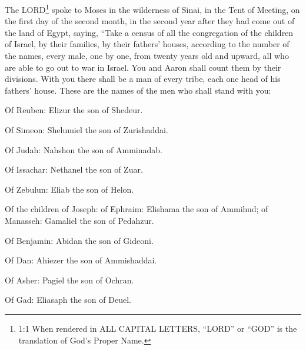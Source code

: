 \newpage
\null
\thispagestyle{empty}
\newpage







\vspace{-1.36in}

\mychapter{}
\myverse*{}The LORD\footnote{ 1:1 When rendered in ALL CAPITAL LETTERS, “LORD” or “GOD” is the translation of God’s Proper Name.}
spoke to Moses in the wilderness of Sinai, in the Tent of Meeting, on the first day of the second month,
in the second year after they had come out of the land of Egypt, saying,
\myverse{}“Take a census of all the congregation of the children of Israel, by their families,
by their fathers’ houses, according to the number of the names, every male, one by one,
\myverse{}from twenty years old and upward, all who are able to go out to war in Israel.
You and Aaron shall count them by their divisions.
\myverse{}With you there shall be a man of every tribe, each one head of his fathers’
house.
\myverse{}These are the names of the men who shall stand with you:

Of Reuben: Elizur the son of Shedeur.


\myverse{}Of Simeon: Shelumiel the son of Zurishaddai.


\myverse{}Of Judah: Nahshon the son of Amminadab.


\myverse{}Of Issachar: Nethanel the son of Zuar.


\myverse{}Of Zebulun: Eliab the son of Helon.


\myverse{}Of the children of Joseph: of Ephraim: Elishama the son of Ammihud;
of Manasseh: Gamaliel the son of Pedahzur.


\myverse{}Of Benjamin: Abidan the son of Gideoni.


\myverse{}Of Dan: Ahiezer the son of Ammishaddai.


\myverse{}Of Asher: Pagiel the son of Ochran.


\myverse{}Of Gad: Eliasaph the son of Deuel.


